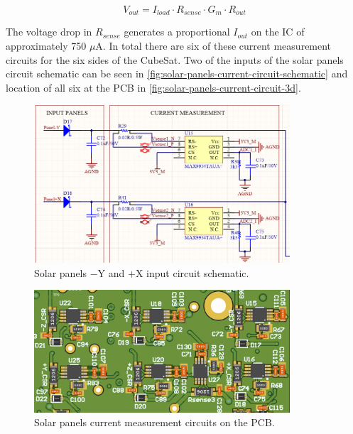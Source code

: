 \begin{equation}
V_{out} = I_{load} \cdot R_{sense} \cdot G_{m} \cdot R_{out}
\end{equation}

The voltage drop in $R_{sense}$ generates a proportional $I_{out}$ on the IC of approximately 750 $\mu$A.
In total there are six of these current measurement circuits for the six sides of the CubeSat.
Two of the inputs of the solar panels circuit schematic can be seen in \autoref{fig:solar-panels-current-circuit-schematic} and location of all six at the PCB in \autoref{fig:solar-panels-current-circuit-3d}.

\begin{figure}[!ht]
    \begin{center}
        \includegraphics[width=0.85\textwidth]{figures/solar-panels-current-circuit-schematic.png}
        \caption{Solar panels $-$Y and $+$X input circuit schematic.}
        \label{fig:solar-panels-current-circuit-schematic}
    \end{center}
\end{figure}

\begin{figure}[!ht]
    \begin{center}
        \includegraphics[width=0.85\textwidth]{figures/solar-panels-current-circuit-3d.png}
        \caption{Solar panels current measurement circuits on the PCB.}
        \label{fig:solar-panels-current-circuit-3d}
    \end{center}
\end{figure}


